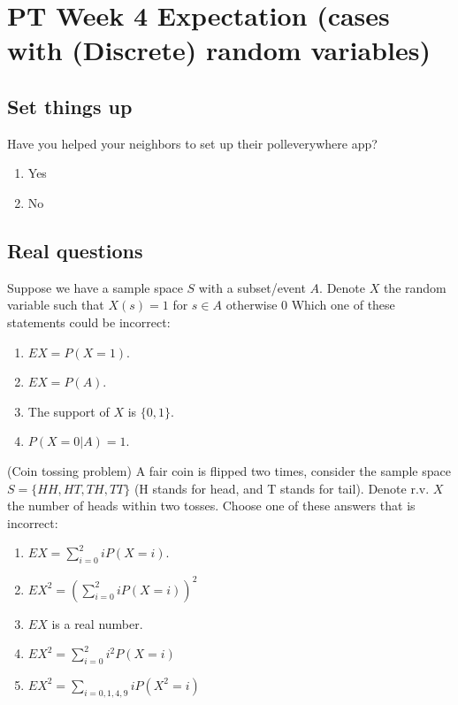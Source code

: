 \documentclass[poll_tutorial_format]{subfiles}
\begin{document}
	\maketitle
	\section{PT Week 4 Expectation (cases with (Discrete) random variables)}
	
	\subsection{Set things up}
	\label{sec:set-things-up}
	
	
	
	\setcounter{theorem}{-1}
	
	\begin{exercise}
		Have you helped your neighbors to set up their polleverywhere app? 
		\begin{enumerate}
			\item Yes
			\item No
		\end{enumerate}
	\end{exercise}
	
	\subsection{Real questions}
	\label{sec:start-real-questions pt week 4}
	\begin{exercise}
		Suppose we have a sample space $S$ with a subset/event $A$. Denote $X$ the random variable such that $X(s)=1$ for $s\in A$ otherwise $0$ 
		Which one of these statements could be incorrect:%
		\begin{enumerate}
			\item $EX=P(X=1)$.
			\item $EX=P(A)$.
			\item The support of $X$ is $\{0,1\}$.
			\item $P(X=0|A)=1$. 
		\end{enumerate}
	\end{exercise}
	
	
	\begin{exercise}
		(Coin tossing problem) A fair coin is flipped two times, consider the sample space $S=\{HH, HT, TH, TT\}$ (H stands for head, and T stands for tail). Denote r.v. $X$ the number of heads within two tosses.
		Choose one of these answers that is incorrect: %
		\begin{enumerate}
			\item $EX=\sum_{i=0}^2 iP(X=i)$.
			\item $EX^2=\left(\sum_{i=0}^2 iP(X=i) \right)^2$ 
			\item $EX$ is a real number.
			\item $EX^2=\sum_{i=0}^2 i^2P(X=i)$
			\item $EX^2=\sum_{i=0,1,4,9} iP(X^2=i)$
		\end{enumerate}
	\end{exercise}
	
\end{document}
